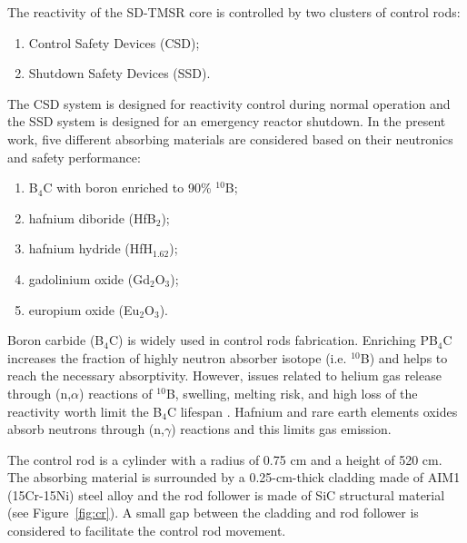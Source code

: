 The reactivity of the SD-TMSR core is controlled by two clusters of control 
rods:
\begin{enumerate}
\item Control Safety Devices (CSD);
\item Shutdown Safety Devices (SSD).
\end{enumerate}
The CSD system is designed for reactivity control during normal operation and the SSD system is designed for an emergency reactor shutdown.
In the present work, five different absorbing materials are considered based on their neutronics and safety performance:
\begin{enumerate}
\item B$_4$C with boron enriched to 90\% $^{10}$B;
\item hafnium diboride (HfB$_2$);
\item hafnium hydride (HfH$_{1.62}$);
\item gadolinium oxide (Gd$_2$O$_3$);
\item europium oxide (Eu$_2$O$_3$).
\end{enumerate}
Boron carbide (B$_4$C) is widely used in control rods fabrication. Enriching 
PB$_4$C increases the fraction of highly neutron absorber isotope (i.e. 
$^{10}$B) and helps to reach the necessary absorptivity. However, issues 
related to helium gas release through (n,$\alpha$) reactions of $^{10}$B, 
swelling, melting risk, and high loss of the reactivity worth limit the B$_4$C 
lifespan \cite{guo2019optimized}. Hafnium and rare earth elements oxides 
absorb neutrons through (n,$\gamma$) reactions and this limits gas emission.

The control rod is a cylinder with a radius of 0.75 cm and a height of 520 cm. 
The absorbing material is surrounded by a 0.25-cm-thick cladding made of AIM1 
(15Cr-15Ni) steel alloy \cite{SERAN2017285} and the rod follower is made of 
SiC structural material (see Figure~\ref{fig:cr}). A small gap between the 
cladding and rod follower is considered to facilitate the control rod movement.

